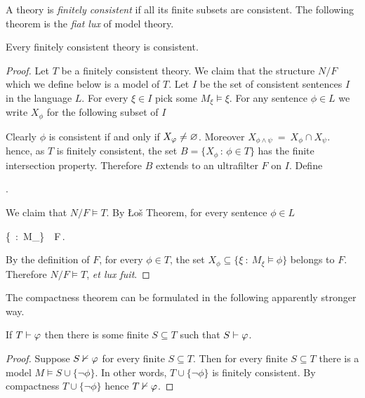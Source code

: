\documentclass[creche.tex]{subfiles}
\begin{document}
A theory is \emph{finitely consistent\/} if all its finite subsets are consistent. The following theorem is the \textit{fiat lux\/} of model theory. 

\begin{void_thm}\label{thmcompattezza}
Every finitely consistent theory is consistent. 
\end{void_thm}

\begin{proof}
Let  $T$ be a finitely consistent theory. We claim that the structure $N/F$ which we define below is a model of $T$. Let $I$ be the set of consistent sentences $I$ in the language $L$. For every $\xi\in I$ pick some $M_\xi\models\xi$. For any sentence $\phi\in L$ we write $X_\phi$ for the following subset of $I$


Clearly $\phi$ is consistent if and only if $X_\varphi\neq\varnothing$. Moreover $X_{\phi\wedge\psi}\ =\ X_\phi\cap X_\psi$. hence, as $T$ is finitely consistent, the set $B=\big\{X_\phi\,:\,\phi\in T\big\}$ has the finite intersection property. Therefore $B$ extends to an ultrafilter $F$ on $I$. Define

.

We claim that $N/F\models T$. By \L o\v{s} Theorem, for every sentence $\phi\in L$

%
{\IFF}%
{\Big\{\xi\ :\ M_\xi\models\phi\Big\}\ \in\ F\,.}

By the definition of $F$, for every $\phi\in T$, the set $X_\phi\subseteq \big\{\xi\ :\ M_\xi\models \phi\big\}$ belongs to $F$. Therefore $N/F\models T$, \textit{et lux fuit}.
\end{proof}

The compactness theorem can be formulated in the following apparently stronger way.

\begin{corollary}\label{compattezza2}
If $T\vdash\varphi$ then there is some finite $S\subseteq T$ such that $S\vdash\varphi$.
\end{corollary}

\begin{proof}
Suppose $S\nvdash\varphi$ for every finite $S\subseteq T$. Then for every finite $S\subseteq T$ there is a model $M\models S\cup\{\neg\phi\}$. In other words, $T\cup\{\neg\phi\}$ is finitely consistent. By compactness $T\cup\{\neg\phi\}$ hence $T\nvdash \varphi$.
\end{proof}
\end{document}
